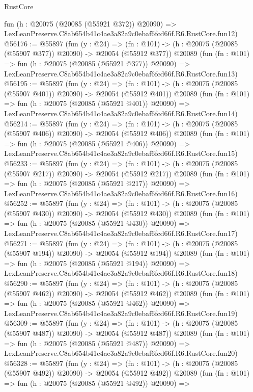 \begin{lexlean}{RustCore}
\begin{coremodule}
    fun (h : @20075 (@20085 (@55921 @372)) @20090) =>
    LexLeanPreserve.C8ab654b41c4ae3a82a9c0ebaf6fcd66f.R6.RustCore.fun12)
@56176 := @55897
    (fun (y : @24) =>
    (fn : @101) -> (h : @20075 (@20085 (@55907 @377)) @20090) -> @20054 (@55912 @377))
    @20089
    (fun (fn : @101) =>
    fun (h : @20075 (@20085 (@55921 @377)) @20090) =>
    LexLeanPreserve.C8ab654b41c4ae3a82a9c0ebaf6fcd66f.R6.RustCore.fun13)
@56195 := @55897
    (fun (y : @24) =>
    (fn : @101) -> (h : @20075 (@20085 (@55907 @401)) @20090) -> @20054 (@55912 @401))
    @20089
    (fun (fn : @101) =>
    fun (h : @20075 (@20085 (@55921 @401)) @20090) =>
    LexLeanPreserve.C8ab654b41c4ae3a82a9c0ebaf6fcd66f.R6.RustCore.fun14)
@56214 := @55897
    (fun (y : @24) =>
    (fn : @101) -> (h : @20075 (@20085 (@55907 @406)) @20090) -> @20054 (@55912 @406))
    @20089
    (fun (fn : @101) =>
    fun (h : @20075 (@20085 (@55921 @406)) @20090) =>
    LexLeanPreserve.C8ab654b41c4ae3a82a9c0ebaf6fcd66f.R6.RustCore.fun15)
@56233 := @55897
    (fun (y : @24) =>
    (fn : @101) -> (h : @20075 (@20085 (@55907 @217)) @20090) -> @20054 (@55912 @217))
    @20089
    (fun (fn : @101) =>
    fun (h : @20075 (@20085 (@55921 @217)) @20090) =>
    LexLeanPreserve.C8ab654b41c4ae3a82a9c0ebaf6fcd66f.R6.RustCore.fun16)
@56252 := @55897
    (fun (y : @24) =>
    (fn : @101) -> (h : @20075 (@20085 (@55907 @430)) @20090) -> @20054 (@55912 @430))
    @20089
    (fun (fn : @101) =>
    fun (h : @20075 (@20085 (@55921 @430)) @20090) =>
    LexLeanPreserve.C8ab654b41c4ae3a82a9c0ebaf6fcd66f.R6.RustCore.fun17)
@56271 := @55897
    (fun (y : @24) =>
    (fn : @101) -> (h : @20075 (@20085 (@55907 @194)) @20090) -> @20054 (@55912 @194))
    @20089
    (fun (fn : @101) =>
    fun (h : @20075 (@20085 (@55921 @194)) @20090) =>
    LexLeanPreserve.C8ab654b41c4ae3a82a9c0ebaf6fcd66f.R6.RustCore.fun18)
@56290 := @55897
    (fun (y : @24) =>
    (fn : @101) -> (h : @20075 (@20085 (@55907 @462)) @20090) -> @20054 (@55912 @462))
    @20089
    (fun (fn : @101) =>
    fun (h : @20075 (@20085 (@55921 @462)) @20090) =>
    LexLeanPreserve.C8ab654b41c4ae3a82a9c0ebaf6fcd66f.R6.RustCore.fun19)
@56309 := @55897
    (fun (y : @24) =>
    (fn : @101) -> (h : @20075 (@20085 (@55907 @487)) @20090) -> @20054 (@55912 @487))
    @20089
    (fun (fn : @101) =>
    fun (h : @20075 (@20085 (@55921 @487)) @20090) =>
    LexLeanPreserve.C8ab654b41c4ae3a82a9c0ebaf6fcd66f.R6.RustCore.fun20)
@56328 := @55897
    (fun (y : @24) =>
    (fn : @101) -> (h : @20075 (@20085 (@55907 @492)) @20090) -> @20054 (@55912 @492))
    @20089
    (fun (fn : @101) =>
    fun (h : @20075 (@20085 (@55921 @492)) @20090) =>

\end{coremodule}
\end{lexlean}

